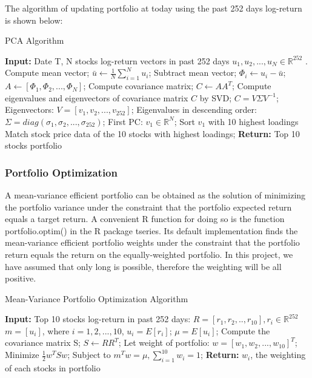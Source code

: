 \documentclass[11pt,a4paper]{article}
\begin{document}
    \noindent
    The algorithm of updating portfolio at today using the past 252 days log-return is shown below:
    \begin{algorithm}[H]
    \caption{PCA Algorithm}
    \begin{algorithmic}[1]
    \State \textbf{Input:} Date T, N stocks log-return vectors in past 252 days $u_{1},u_{2}, ... ,u_{N} \in \mathbb{R}^{252}$ .
    \State Compute mean vector;
    \State $\bar{u} \gets \frac{1}{N} \sum_{i=1}^{N}u_{i}$;
    \State Subtract mean vector;
        \State $\Phi_{i} \gets u_{i} - \bar{u}$;
    \EndFor
    \State $A \gets [\Phi_{1}, \Phi_{2}, ..., \Phi_{N}]$;
    \State Compute covariance matrix;
    \State $C \gets  AA^{T}$;
    \State Compute eigenvalues and eigenvectors of covariance matrix $C$ by SVD;
    \State $C = V \Sigma V^{-1}$;
    \State Eigenvectors:
    \State $V = [v_{1}, v_{2}, ..., v_{252}]$;
    \State Eigenvalues in descending order:
    \State $\Sigma = diag(\sigma_{1}, \sigma_{2}, ..., \sigma_{252})$;
    \State First PC: $v_{1} \in \mathbb{R}^{N}$;
    \State Sort $v_{1}$ with 10 highest loadings
    \State Match stock price data of the 10 stocks with highest loadings;
    \State \textbf{Return:} Top 10 stocks portfolio
    \end{algorithmic}
    \end{algorithm}
    
    
    \subsubsection{Portfolio Optimization}
    A mean-variance efficient portfolio can be obtained as the solution of minimizing the portfolio variance under the constraint that the portfolio expected return equals a target return. A convenient R function for doing so is the function portfolio.optim() in the R package tseries. Its default implementation finds the mean-variance efficient portfolio weights under the constraint that the portfolio return equals the return on the equally-weighted portfolio. In this project, we have assumed that only long is possible, therefore the weighting will be all positive.
    
    \begin{algorithm}[H]
    \caption{Mean-Variance Portfolio Optimization Algorithm}
    \begin{algorithmic}[1]
    \State \textbf{Input:} Top 10 stocks log-return in past 252 days: $R = [r_{1}, r_{2}, .., r_{10}], r_{i} \in \mathbb{R}^{252}$
    \State $m = [u_{i}]$, where $i = 1,2, ..., 10$, $u_{i}=E[r_{i}]$;
    \State $\mu = E[u_{i}]$;
    \State Compute the covariance matrix S;
    \State $S \gets RR^{T}$;
    \State Let weight of portfolio: $w = [w_{1},w_{2}, ...,w_{10}]^{T}$;
    \State Minimize $\frac{1}{2}w^{T}Sw$; Subject to $m^{T}w = \mu, \sum_{i=1}^{10}w_{i} = 1$;
    \State \textbf{Return:} $w_{i}$, the weighting of each stocks in portfolio
    \end{algorithmic}
    \end{algorithm}
    
\end{document}
